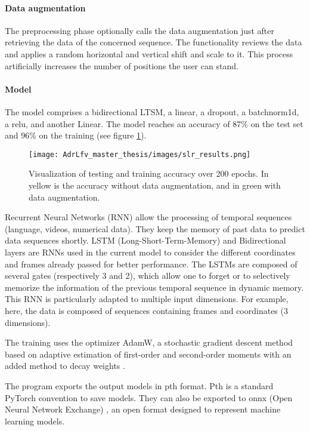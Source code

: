 \paragraph{Data augmentation}

The preprocessing phase optionally calls the data augmentation just after retrieving the data of the concerned sequence. The functionality reviews the data and applies a random horizontal and vertical shift and scale to it. This process artificially increases the number of positions the user can stand.

\paragraph{Model}

The model comprises a bidirectional LTSM, a linear, a dropout, a batchnorm1d, a relu, and another Linear. The model reaches an accuracy of 87\% on the test set and 96\% on the training (see figure \ref{fig:slr_results}).

\begin{figure}[h]
    \centering
    \texttt{[image: AdrLfv\_master\_thesis/images/slr\_results.png]}
    \caption{Visualization of testing and training accuracy over 200 epochs. In yellow is the accuracy without data augmentation, and in green with data augmentation.}
    \label{fig:slr_results}
\end{figure}

Recurrent Neural Networks (RNN) allow the processing of temporal sequences (language, videos, numerical data). They keep the memory of past data to predict data sequences shortly. 
LSTM (Long-Short-Term-Memory) and Bidirectional layers are RNNs used in the current model to consider the different coordinates and frames already passed for better performance. The LSTMs are composed of several gates (respectively 3 and 2), which allow one to forget or to selectively memorize the information of the previous temporal sequence in dynamic memory. This RNN is particularly adapted to multiple input dimensions. For example, here, the data is composed of sequences containing frames and coordinates (3 dimensions).
  
The training uses the optimizer AdamW, a stochastic gradient descent method based on adaptive estimation of first-order and second-order moments with an added method to decay weights \cite{loshchilov2017decoupled}. 

The program exports the output models in pth format. Pth is a standard PyTorch convention to save models. They can also be exported to onnx (Open Neural Network Exchange) \cite{onnx}, an open format designed to represent machine learning models.

